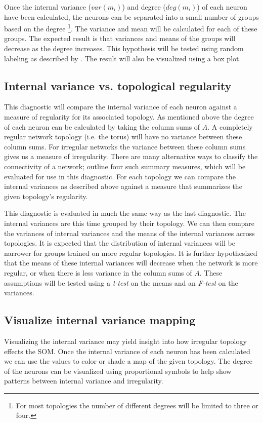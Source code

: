 Once the internal variance ($var(m_i)$) and degree ($deg(m_i)$) of each neuron
have been calculated, the neurons can be separated into a small number of
groups based on the degree \footnote{For most topologies the number of
different degrees will be limited to three or four.}.  The variance and mean
will be calculated for each of these groups.  The expected result is that
variances and means of the groups will decrease as the degree increases.  This
hypothesis will be tested using random labeling as described by \cite{siss2004}.
The result will also be visualized using a box plot.

\subsection{Internal variance vs. topological regularity}
This diagnostic will compare the internal variance of each neuron against a
measure of regularity for its associated topology.  As mentioned above the
degree of each neuron can be calculated by taking the column sums of $A$.  A
completely regular network topology (i.e. the torus) will have no variance
between these column sums.  For irregular networks the variance between these
column sums gives us a measure of irregularity. There are many alternative
ways to classify the connectivity of a network; \cite{florax95} outline four
such summary measures, which will be evaluated for use in this diagnostic.
For each topology we can compare the internal variances as described above
against a measure that summarizes the given topology's regularity.

This diagnostic is evaluated in much the same way as the last diagnostic.  
The internal variances are this time grouped by their topology.  We can then
compare the variances of internal variances and the means of the internal
variances across topologies.  It is expected that the distribution of internal
variances will be narrower for groups trained on more regular topologies.
It is further hypothesized that the means of these internal variances will
decrease when the network is more regular, or when there is less variance in
the column sums of $A$.  These assumptions will be tested using
a \emph{t-test} on the means and an \emph{F-test} on the variances.

\subsection{Visualize internal variance mapping}
Visualizing the internal variance may yield insight into how irregular topology
effects the SOM.  Once the internal variance of each neuron has been calculated
we can use the values to color or shade a map of the given topology.  The degree
of the neurons can be visualized using proportional symbols to help show
patterns between internal variance and irregularity.

